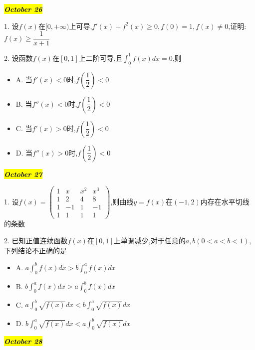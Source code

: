 \hl{\textbf{\textit{October 26}}}

1. 设$f(x)$在$[0,+\infty)$上可导,$f'(x)+f^2(x)\geq 0,f(0)=1,f(x)\neq 0$,证明:  $f(x)\geq \dfrac{1}{x+1}$
\begin{solution}
	
\end{solution}

2. 设函数$f(x)$在$[0,1]$上二阶可导,且$\int_{0}^{1}f(x)dx=0$,则
\begin{itemize}
	\item A. 当$f'(x)<0$时,$f(\dfrac{1}{2})<0$
	\item B. 当$f''(x)<0$时,$f(\dfrac{1}{2})<0$
	\item C. 当$f'(x)>0$时,$f(\dfrac{1}{2})<0$
	\item D. 当$f''(x)>0$时,$f(\dfrac{1}{2})<0$
\end{itemize}
\begin{solution}
	
\end{solution}

\hl{\textbf{\textit{October 27}}}

1. 设$f(x)=\begin{pmatrix}
	1&x&x^2&x^3\\
	1&2&4&8\\
	1&-1&1&-1\\
	1&1&1&1
\end{pmatrix}$,则曲线$y=f(x)$在$(-1,2)$内存在水平切线的条数
\begin{solution}
	
\end{solution}

2. 已知正值连续函数$f(x)$在$[0,1]$上单调减少,对于任意的$a,b(0<a<b<1)$,下列结论不正确的是
\begin{itemize}
	\item A. $a\int_{0}^{b}f(x)dx>b\int_{0}^{a}f(x)dx$
	\item B. $b\int_{0}^{a}f(x)dx>a\int_{0}^{b}f(x)dx$
	\item C. $a\int_{0}^{b}\sqrt{f(x)}dx<b\int_{0}^{a}\sqrt{f(x)}dx$
	\item D. $b\int_{0}^{a}\sqrt{f(x)}dx<a\int_{0}^{b}\sqrt{f(x)}dx$
\end{itemize}
\begin{solution}
	
\end{solution}

\hl{\textbf{\textit{October 28}}}

